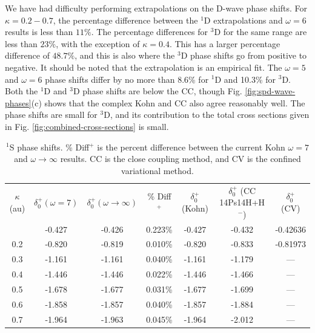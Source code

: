 \documentclass[preprint,showpacs,preprintnumbers,amsmath,amssymb]{revtex4}
\begin{document}
We have had difficulty performing extrapolations on the D-wave phase shifts. For $\kappa = 0.2 - 0.7$, the percentage difference between the $^1$D extrapolations and $\omega = 6$ results is less than $11\%$. The percentage differences for $^3$D for the same range are less than $23\%$, with the exception of $\kappa = 0.4$. This has a larger percentage difference of $48.7\%$, and this is also where the $^3$D phase shifts go from positive to negative. It should be noted that the extrapolation is an empirical fit. The $\omega = 5$ and $\omega = 6$ phase shifts differ by no more than 8.6\% for $^1$D and 10.3\% for $^3$D. Both the $^1$D and $^3$D phase shifts are below the CC, though Fig. \ref{fig:spd-wave-phases}(c) shows that the complex Kohn and CC also agree reasonably well. The phase shifts are small for $^3$D, and its contribution to the total cross sections given in Fig. \ref{fig:combined-cross-sections} is small.


\begin{table}[H]
\centering
\begin{ruledtabular}
\begin{tabular}{c c c c c c c}
$\kappa$ (au) & $\delta_0^+ (\omega = 7)$ & $\delta_0^+ (\omega \rightarrow \infty)$ & \% Diff$^+$ & $\delta_0^+$ (Kohn) \cite{VanReeth2003} & $\delta_0^+$ (CC 14Ps14H+H$^-$) \cite{Walters2004} & $\delta_0^+$ (CV) \cite{Zhang2012} \\
\colrule
0.1 & -0.427 & -0.426 & 0.223\% & -0.427 & -0.432 & -0.42636 \\
0.2 & -0.820 & -0.819 & 0.010\% & -0.820 & -0.833 & -0.81973 \\
0.3 & -1.161 & -1.161 & 0.040\% & -1.161 & -1.179 & --- \\
0.4 & -1.446 & -1.446 & 0.022\% & -1.446 & -1.466 & --- \\
0.5 & -1.678 & -1.677 & 0.031\% & -1.677 & -1.699 & --- \\
0.6 & -1.858 & -1.857 & 0.040\% & -1.857 & -1.884 & --- \\
0.7 & -1.964 & -1.963 & 0.045\% & -1.964 & -2.012 & --- \\
\end{tabular}
\end{ruledtabular}
\caption{$^1$S phase shifts. \% Diff$^+$ is the percent difference between the current Kohn $\omega = 7$ and $\omega \rightarrow \infty$ results. CC is the close coupling method, and CV is the confined variational method.}
\label{tab:SWaveSingletPhase}
\end{table}
\end{document}

